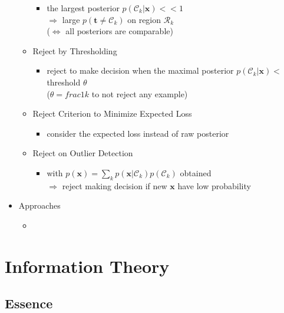 \begin{itemize}
\begin{itemize}
		\begin{itemize}
		\item the largest posterior $p(\mathcal C_k|\mathbf x) << 1$ \\
		$\Rightarrow$ large $p(\mathbf t \neq \mathcal C_k)$ on region $\mathcal R_k$ \\
		($\Leftrightarrow$ all posteriors are comparable)
		\end{itemize}
	\item Reject by Thresholding
		\begin{itemize}
		\item reject to make decision when the maximal posterior $p(\mathcal C_k|\mathbf x) <$ threshold $\theta$ \\
		($\theta=frac 1 k$ to not reject any example)
		\end{itemize}
	\item Reject Criterion to Minimize Expected Loss
		\begin{itemize}
		\item consider the expected loss instead of raw posterior
		\end{itemize}
	\item Reject on Outlier Detection
		\begin{itemize}
		\item with $p(\mathbf x) = \sum_k p(\mathbf x|\mathcal C_k)p(\mathcal C_k)$ obtained \\
		$\Rightarrow$ reject making decision if new $\mathbf x$ have low probability
		\end{itemize}
	\end{itemize}
\item Approaches
	\begin{itemize}
	\item 
	\end{itemize}
\end{itemize}

\section{Information Theory}
\subsection{Essence}
